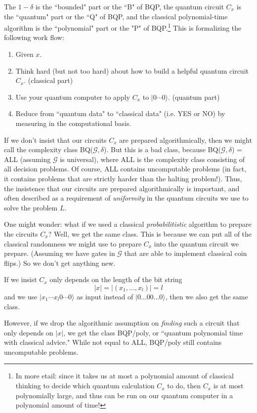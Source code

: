 \documentclass{article}
\newcommand{\ket}[1]{|#1\rangle}
\newcommand{\calG}{\mathcal{G}}
\begin{document}
The \(1 - \delta\) is the ``bounded" part or the ``B" of BQP, the quantum circuit \(C_x\) is the ``quantum" part or the ``Q" of BQP, and the classical polynomial-time algorithm is the ``polynomial" part or the "P" of BQP.\footnote{In more etail: since it takes us at most a polynomial amount of classical thinking to decide which quantum calculation $C_x$ to do, then $C_x$ is at most polynomially large, and thus can be run on our quantum computer in a polynomial amount of time!} This is formalizing the following work flow:
\begin{enumerate}
    \item Given \(x\).
    \item Think hard (but not too hard) about how to build a helpful quantum circuit \(C_x\). (classical part)
    \item Use your quantum computer to apply \(C_x\) to \(\ket{0\dotsb0}\). (quantum part)
    \item Reduce from ``quantum data" to ``classical data" (i.e. YES or NO) by measuring in the computational basis.
\end{enumerate}

If we don't insist that our circuits \(C_x\) are prepared algorithmically, then we might call the complexity class BQ($\calG,\delta$). But this is a bad class, because  BQ($\calG,\delta$) = ALL (assuming \(\calG\) is universal), where ALL is the complexity class consisting of all decision problems.  Of course, ALL contains uncomputable problems (in fact, it contains problems that are strictly harder than the halting problem!).  Thus, the insistence that our circuits are prepared algorithmically is important, and often described as a requirement of \emph{uniformity} in the quantum circuits we use to solve the problem $L$.

One might wonder: what if we used a classical \emph{probabilitistic} algorithm to prepare the circuits $C_x$?  Well, we get the same class.  This is because we can put all of the classical randomness we might use to prepare $C_x$ into the quantum circuit we prepare.  (Assuming we have gates in $\calG$ that are able to implement classical coin flips.)  So we don't get anything new.

If we insist \(C_x\) only depends on the length of the bit string
\[|x| = |(x_1,\dots,x_l)| = l\]
and we use \(\ket{x_1 \cdots x_l 0\cdots 0}\) as input instead of $\ket{0\dots00\dots0}$, then we also get the same class.

However, if we drop the algorithmic assumption on \emph{finding} such a circuit that only depends on $|x|$, we get the class BQP/poly, or ``quantum polynomial time with classical advice."  While not equal to ALL, BQP/poly still contains uncomputable problems.
\end{document}
